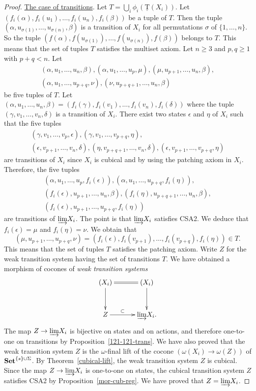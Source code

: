 \documentclass[a4paper,12pt]{amsart}
\begin{document}
\begin{proof}
\underline{The case of transitions}. Let $T=\bigcup_i
\phi_i(\operatorname{\underline{T}}(X_i))$. Let
$(f_i(\alpha),f_i(u_1),\dots,f_i(u_n),f_i(\beta))$ be a tuple of $T$.
Then the tuple $(\alpha,u_{\sigma(1)},\dots,u_{\sigma(n)},\beta)$ is a
transition of $X_i$ for all permutations $\sigma$ of
$\{1,\dots,n\}$. So the tuple
$(f(\alpha),f(u_{\sigma(1)}),\dots,f(u_{\sigma(n)}),f(\beta))$ belongs
to $T$. This means that the set of tuples $T$ satisfies the multiset
axiom. Let $n{\geqslant} 3$ and $p,q {\geqslant} 1$ with $p+q < n$. Let
  \begin{multline*}(\alpha,u_1, \dots, u_n, \beta),(\alpha,u_1, \dots,
u_p, \mu),(\mu, u_{p+1}, \dots, u_n, \beta),\\(\alpha, u_1, \dots,
u_{p+q}, \nu),(\nu, u_{p+q+1}, \dots, u_n, \beta)
\end{multline*} be five tuples of $T$. Let $(\alpha,u_1, \dots, u_n,
\beta) = (f_i(\gamma),f_i(v_1),\dots,f_i(v_n),f_i(\delta))$ where the
tuple $(\gamma,v_1,\dots,v_n,\delta)$ is a transition of $X_i$.  There
exist two states $\epsilon$ and $\eta$ of $X_i$ such that the five
tuples\begin{multline*} (\gamma,v_1,\dots,v_p,\epsilon),
  (\gamma,v_1,\dots,v_{p+q},\eta),\\
  (\epsilon,v_{p+1},\dots,v_n,\delta),
  (\eta,v_{p+q+1},\dots,v_n,\delta),
  (\epsilon,v_{p+1},\dots,v_{p+q},\eta) \end{multline*} are
transitions of $X_i$ since $X_i$ is cubical and by using the patching
axiom in $X_i$.  Therefore, the five tuples
\begin{multline*}
  (\alpha,u_1,\dots,u_p,f_i(\epsilon)),
  (\alpha,u_1,\dots,u_{p+q},f_i(\eta)),\\
  (f_i(\epsilon),u_{p+1},\dots,u_n,\beta),
  (f_i(\eta),u_{p+q+1},\dots,u_n,\beta),\\
  (f_i(\epsilon),u_{p+1},\dots,u_{p+q},f_i(\eta))
\end{multline*}
are transitions of ${\varinjlim} X_i$. The point is that ${\varinjlim} X_i$
satisfies CSA2. We deduce that $f_i(\epsilon)=\mu$ and
$f_i(\eta)=\nu$.  We obtain that
\[(\mu,u_{p+1},\dots,u_{p+q},\nu)=(f_i(\epsilon),f_i(v_{p+1}),\dots,f_i(v_{p+q}),f_i(\eta))
\in T.\] This means that the set of tuples $T$ satisfies the patching
axiom. Write $Z$ for the weak transition system having the set of
transitions $T$.  We have obtained a morphism of cocones of \emph{weak
  transition systems}
\[
\xymatrix@C=3em@R=3em
{
(X_i) \ar@{=}[r] {\ar@{->}[d]_-{{}}} & (X_i) {\ar@{->}[d]_-{{}}} \\
Z {\ar@{->}[r]^-{{\subset}}} & {\varinjlim} X_i.
}
\]
The map $Z\to {\varinjlim} X_i$ is bijective on states and on actions, and
therefore one-to-one on transitions by
Proposition~\ref{121-121-trans}. We have also proved that
the weak transition system $Z$ is the $\omega$-final lift of the
cocone $(\omega(X_i) \to \omega(Z))$ of ${{{\rm{\mathbf{{Set}}}}}}^{\{s\}\cup \Sigma}$.  By
Theorem~\ref{cubical-lift}, the weak transition system $Z$ is cubical.
Since the map $Z\to {\varinjlim} X_i$ is one-to-one on states, the cubical
transition system $Z$ satisfies CSA2 by Proposition~\ref{mor-cub-reg}.
We have proved that $Z= {\varinjlim} X_i$.  \end{proof}
\end{document}
